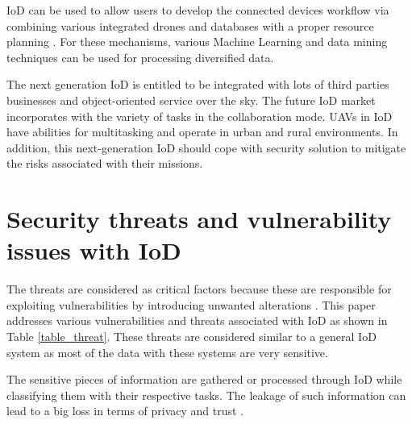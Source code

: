 \documentclass{easychair}
\begin{document}
IoD can be used to allow users to develop the connected devices workflow via combining various integrated drones and databases with a proper resource planning \cite{sharma2017uav}. For these mechanisms, various Machine Learning and data mining techniques can be used for processing diversified data\cite{abomhara2015cyber}.

The next generation IoD is entitled to be integrated with lots of third parties businesses and object-oriented service over the sky. The future IoD market incorporates with the variety of tasks in the collaboration mode. UAVs in IoD have abilities for multitasking and operate in urban and rural environments. In addition, this next-generation IoD should cope with security solution to mitigate the risks associated with their missions.

\section{Security threats and vulnerability issues with IoD}
\label{sect:IoD_threats}
The threats are considered as critical factors because these are responsible for exploiting vulnerabilities by introducing unwanted alterations \cite{kanellos2016safety}. This paper addresses various vulnerabilities and threats associated with IoD as shown in Table \ref{table_threat}. These threats are considered similar to a general IoD system as most of the data with these systems are very sensitive.

The sensitive pieces of information are gathered or processed through IoD while classifying them with their respective tasks. The leakage of such information can lead to a big loss in terms of privacy and trust \cite{akram2017security}.
\end{document}

